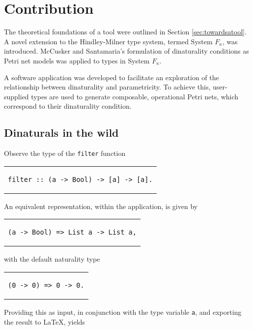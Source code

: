 \documentclass[../Dissertation.tex]{subfiles}
\begin{document}
\section{Contribution}
The theoretical foundations of a tool were outlined in Section \ref{sec:towardsatool}. A novel extension to the Hindley-Milner type system, termed System $F_\kappa$, was introduced. McCusker and Santamaria's formulation of dinaturality conditions as Petri net models was applied to types in System $F_\kappa$. 
\par
A software application was developed to facilitate an exploration of the relationship between dinaturality and parametricity. To achieve this, user-supplied types are used to generate composable, operational Petri nets, which correspond to their dinaturality condition.

\subsection{Dinaturals in the wild}
Observe the type of the \lstinline{filter} function
\begin{center}
\begin{tabular}{c}
\begin{lstlisting}
filter :: (a -> Bool) -> [a] -> [a].
\end{lstlisting}
\end{tabular}
\end{center}
An equivalent representation, within the application, is given by
\begin{center}
\begin{tabular}{c}
\begin{lstlisting}
(a -> Bool) => List a -> List a,
\end{lstlisting}
\end{tabular}
\end{center}
with the default naturality type
\begin{center}
\begin{tabular}{c}
\begin{lstlisting}
(0 -> 0) => 0 -> 0.
\end{lstlisting}
\end{tabular}
\end{center}
Providing this as input, in conjunction with the type variable \lstinline{a}, and exporting the result to LaTeX, yields
\end{document}
